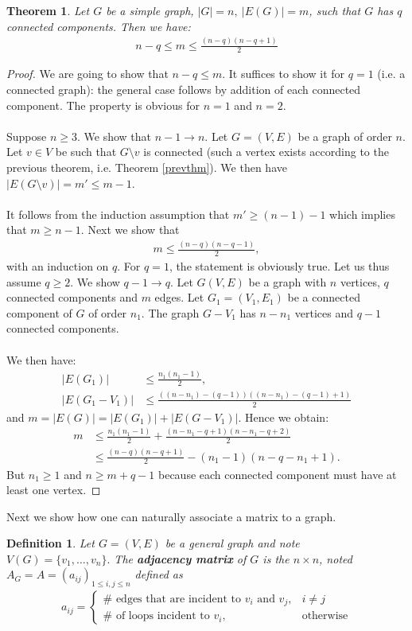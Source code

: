 \documentclass[12pt,a4paper]{article}
\newtheorem{thm}{Theorem}[section]
\newtheorem{defn}{Definition}[section]
\theoremstyle{definition}
\begin{document}
\begin{thm} Let $G$ be a simple graph, $|G|=n, \ |E(G)|=m$, such that $G$ has $q$ connected components. Then we have:
\begin{align*}
n-q \leq m \leq \frac{(n-q)(n-q+1)}{2}
\end{align*}
\end{thm}
\begin{proof}
We are going to show that $n-q \leq m$. It suffices to show it for $q=1$ (i.e. a connected graph): the general case follows by addition of each connected component. The property is obvious for $n=1$ and $n=2$.
\\
\\ Suppose $n \geq 3$. We show that $n- 1 \to n$. Let $G=(V,E)$ be a graph of order $n$. Let $v \in V$ be such that $G \setminus v$ is connected (such a vertex exists according to the previous theorem, i.e. Theorem \ref{prevthm}). We then have $|E(G \setminus v)| = m' \leq m-1$. 
\\\\
It follows from the induction assumption that $m' \geq (n-1)-1 $ which implies that $m \geq n-1.$ Next we show that 
\begin{align*}
m \leq \frac{(n-q)(n-q-1)}{2},
\end{align*}
with an induction on $q$. For $q=1$, the statement is obviously true. Let us thus assume $q \geq 2$. We show $q-1 \to q$. Let $G(V,E)$ be a graph with $n$ vertices, $q$ connected components and $m$ edges. Let $G_1=(V_1,E_1)$ be a connected component of $G$ of order $n_1$. The graph $G-V_1$ has $n-n_1$ vertices and $q-1$ connected components. 
\\\\
We then have:
\begin{align*}
|E(G_1)| & \leq \frac{n_1(n_1-1)}{2}, \\
|E(G_1-V_1)| & \leq \frac{((n-n_1)-(q-1))((n-n_1)-(q-1)+1)}{2}
\end{align*}
and $m=|E(G)|= |E(G_1)|+|E(G-V_1)|.$ Hence we obtain:
\begin{align*}
m & \leq \frac{n_1(n_1-1)}{2}+ \frac{(n-n_1-q+1)(n-n_1-q+2)}{2} \\
& \leq \frac{(n-q)(n-q+1)}{2}-(n_1-1)(n-q-n_1+1).
\end{align*}
But $n_1 \geq 1$ and $n \geq m + q-1$ because each connected component must have at least one vertex. 
\end{proof}
\newpage
Next we show how one can naturally associate a matrix to a graph.
\begin{defn} Let $G=(V,E)$ be a general graph and note $V(G)=\{v_1, \dots , v_n\}.$ The \textbf{adjacency matrix} of $G$ is the $n \times n$, noted $A_G=A=(a_{ij})_{1 \leq i,j \leq n}$ defined  as
\begin{align*}
a_{ij} = \begin{cases} \# \text{ edges that are incident to $v_i$ and $v_j$}, & i \neq j \\ \# \text{ of loops incident to $v_i$}, & \text{otherwise} \end{cases}
\end{align*}
\end{defn}
\end{document}
